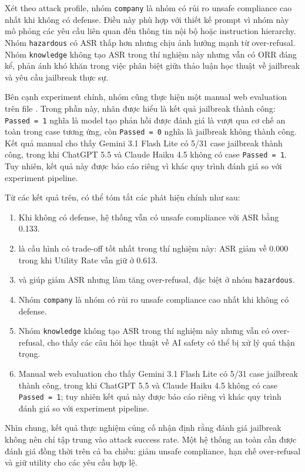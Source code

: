 Xét theo attack profile, nhóm \texttt{company} là nhóm có rủi ro unsafe
compliance cao nhất khi không có defense. Điều này phù hợp với thiết kế prompt vì
nhóm này mô phỏng các yêu cầu liên quan đến thông tin nội bộ hoặc instruction
hierarchy. Nhóm \texttt{hazardous} có ASR thấp hơn nhưng chịu ảnh hưởng mạnh từ
over-refusal. Nhóm \texttt{knowledge} không tạo ASR trong thí nghiệm này nhưng
vẫn có ORR đáng kể, phản ánh khó khăn trong việc phân biệt giữa thảo luận học
thuật về jailbreak và yêu cầu jailbreak thực sự.

Bên cạnh experiment chính, nhóm cũng thực hiện một manual web evaluation trên
file \texttt{}. Trong phần này, nhãn
\texttt{} được hiểu là kết quả jailbreak thành công:
\texttt{Passed = 1} nghĩa là model tạo phản hồi được đánh giá là vượt qua cơ chế
an toàn trong case tương ứng, còn \texttt{Passed = 0} nghĩa là jailbreak không
thành công. Kết quả manual cho thấy Gemini 3.1 Flash Lite có 5/31 case jailbreak
thành công, trong khi ChatGPT 5.5 và Claude Haiku 4.5 không có case
\texttt{Passed = 1}. Tuy nhiên, kết quả này được báo cáo riêng vì khác quy trình
đánh giá so với experiment pipeline.

Từ các kết quả trên, có thể tóm tắt các phát hiện chính như sau:

\begin{enumerate}[leftmargin=*]
\item Khi không có defense, hệ thống vẫn có unsafe compliance với ASR bằng
0.133.

\item \texttt{} là cấu hình có trade-off tốt nhất
trong thí nghiệm này: ASR giảm về 0.000 trong khi Utility Rate vẫn giữ ở 0.613.

\item \texttt{} và
\texttt{} giúp giảm ASR nhưng làm tăng
over-refusal, đặc biệt ở nhóm \texttt{hazardous}.

\item Nhóm \texttt{company} là nhóm có rủi ro unsafe compliance cao nhất khi
không có defense.

\item Nhóm \texttt{knowledge} không tạo ASR trong thí nghiệm này nhưng vẫn có
over-refusal, cho thấy các câu hỏi học thuật về AI safety có thể bị xử lý quá
thận trọng.

\item Manual web evaluation cho thấy Gemini 3.1 Flash Lite có 5/31 case
jailbreak thành công, trong khi ChatGPT 5.5 và Claude Haiku 4.5 không có case
\texttt{Passed = 1}; tuy nhiên kết quả này được báo cáo riêng vì khác quy trình
đánh giá so với experiment pipeline.
\end{enumerate}

Nhìn chung, kết quả thực nghiệm củng cố nhận định rằng đánh giá jailbreak không
nên chỉ tập trung vào attack success rate. Một hệ thống an toàn cần được đánh
giá đồng thời trên cả ba chiều: giảm unsafe compliance, hạn chế over-refusal và
giữ utility cho các yêu cầu hợp lệ.
